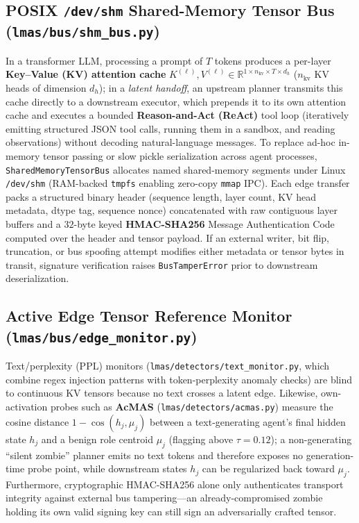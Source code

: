 \documentclass[11pt]{article}
\begin{document}
\subsection{POSIX \texttt{/dev/shm} Shared-Memory Tensor Bus (\texttt{lmas/bus/shm\_bus.py})}
In a transformer LLM, processing a prompt of $T$ tokens produces a per-layer \textbf{Key--Value (KV) attention cache} $K^{(\ell)}, V^{(\ell)} \in \mathbb{R}^{1 \times n_{\text{kv}} \times T \times d_h}$ ($n_{\text{kv}}$ KV heads of dimension $d_h$); in a \emph{latent handoff}, an upstream planner transmits this cache directly to a downstream executor, which prepends it to its own attention cache and executes a bounded \textbf{Reason-and-Act (ReAct)} tool loop (iteratively emitting structured JSON tool calls, running them in a sandbox, and reading observations) without decoding natural-language messages. To replace ad-hoc in-memory tensor passing or slow pickle serialization across agent processes, \texttt{SharedMemoryTensorBus} allocates named shared-memory segments under Linux \texttt{/dev/shm} (RAM-backed \texttt{tmpfs} enabling zero-copy \texttt{mmap} IPC). Each edge transfer packs a structured binary header (sequence length, layer count, KV head metadata, dtype tag, sequence nonce) concatenated with raw contiguous layer buffers and a $32$-byte keyed \textbf{HMAC-SHA256} Message Authentication Code computed over the header and tensor payload. If an external writer, bit flip, truncation, or bus spoofing attempt modifies either metadata or tensor bytes in transit, signature verification raises \texttt{BusTamperError} prior to downstream deserialization.

\subsection{Active Edge Tensor Reference Monitor (\texttt{lmas/bus/edge\_monitor.py})}
Text/perplexity (PPL) monitors (\texttt{lmas/detectors/text\_monitor.py}, which combine regex injection patterns with token-perplexity anomaly checks) are blind to continuous KV tensors because no text crosses a latent edge. Likewise, own-activation probes such as \textbf{AcMAS} (\texttt{lmas/detectors/acmas.py}) measure the cosine distance $1-\cos(h_j,\mu_j)$ between a text-generating agent's final hidden state $h_j$ and a benign role centroid $\mu_j$ (flagging above $\tau=0.12$); a non-generating ``silent zombie'' planner emits no text tokens and therefore exposes no generation-time probe point, while downstream states $h_j$ can be regularized back toward $\mu_j$. Furthermore, cryptographic HMAC-SHA256 alone only authenticates transport integrity against external bus tampering---an already-compromised zombie holding its own valid signing key can still sign an adversarially crafted tensor.
\end{document}
